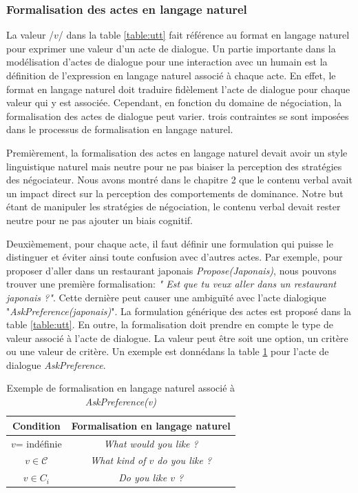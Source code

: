 				
		\subsubsection{Formalisation des actes en langage naturel}
		\label{sec:formalisation}
			La valeur /$v$/ dans la table \ref{table:utt} fait référence au format en langage naturel pour exprimer une valeur d'un acte de dialogue.
			Un partie importante dans la modélisation d'actes de dialogue pour une interaction avec un humain est la définition de l'expression en langage naturel associé à chaque acte. En effet, le format en langage naturel doit traduire fidèlement l'acte de dialogue pour chaque valeur qui y est associée.
			Cependant, en fonction du domaine de négociation, la formalisation des actes de dialogue peut varier. trois contraintes se sont imposées dans le processus de formalisation en langage naturel. 
			
			Premièrement, la formalisation des actes en langage naturel devait avoir un style linguistique naturel mais neutre pour ne pas biaiser la perception des stratégies des négociateur. Nous avons montré dans le chapitre 2 que le contenu verbal avait un impact direct sur la perception des comportements de dominance. 
			Notre but étant de manipuler les stratégies de négociation, le contenu verbal devait rester neutre pour ne pas ajouter un biais cognitif.
			
			Deuxièmement, pour chaque acte, il faut définir une formulation qui puisse le distinguer et éviter ainsi toute confusion avec d'autres actes. Par exemple, pour proposer d'aller dans un restaurant japonais \emph{Propose(Japonais)}, nous pouvons trouver une première formalisation: \emph{" Est que tu veux aller dans un restaurant japonais ?"}. Cette dernière peut causer une ambiguïté avec l'acte dialogique "\textit{AskPreference(japonais)}". 
			La formulation générique des actes est proposé dans la table \ref{table:utt}. En outre, la formalisation doit prendre en compte le type de valeur associé à l'acte de dialogue. La valeur peut être soit une option, un critère ou une valeur de critère. Un exemple est donnédans la table \ref{tab:askEx} pour l'acte de dialogue \emph{AskPreference}. 
			
			
				\begin{table} [h]
					\begin{tabular} {c c}
						\hline
						\hline
						Condition & Formalisation en langage naturel \\
						\hline
						$v$= indéfinie & \textit{What would you like ?} \\
						\hline
						$v \in \mathcal{C}$ & \textit{What kind of $v$ do you like ?} \\
						\hline
						$ v \in C_i $ & \textit{Do you like $v$ ?} \\
						\hline
						\hline
						
					\end{tabular}
					\caption{\label{tab:askEx} Exemple de formalisation en langage naturel associé à \emph{AskPreference(v)}}
				\end{table}
			
